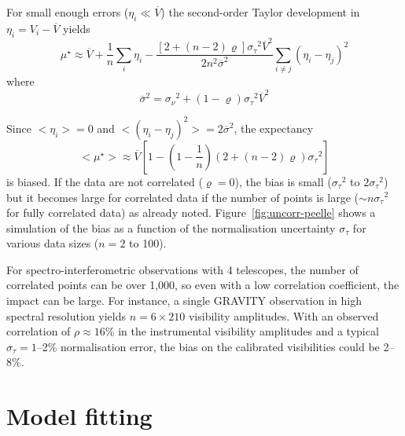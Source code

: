 \documentclass[a4paper,fleqn,usenatbib]{mnras}
\def\expect#1{\ensuremath{ {<#1>} }}
\def\ppp#1{#1^\star}
\def\norm{_\tau}
\def\meas{_\nu}
\def\mean#1{\overline{#1}}
\def\data{\ensuremath{{\scriptstyle V}}}
\def\datamean{\ensuremath{\mean\data}}
\def\mod{\ensuremath{\mu}}
\def\error{\ensuremath{\eta}}
\def\dev{\ensuremath{\sigma}}
\def\devmean{\ensuremath{\mean\dev}}
\def\reldev{\ensuremath{\dev\norm}}
\def\absdev{\ensuremath{\dev\meas}}
\def\corr{\ensuremath{\varrho}}
\begin{document}
For small enough errors ($\error_i \ll \datamean$) the second-order Taylor development in $\error_i = \data_i - \datamean$ yields 
\begin{equation}
    \ppp{\mod} \approx  \datamean 
                  +\frac1n {\sum\limits_i \error_i}
                       - \frac {[2 + (n - 2)\corr]\reldev^2\datamean^2
                          }{
                           2n^2 \devmean^2             
                          }
                           \sum\limits_{i\ne j} (\error_i-\error_j)^2
\end{equation}
where
\begin{equation}
    \devmean^2 = \absdev^2+(1-\corr)\reldev^2\datamean^2 
\end{equation}

Since $\expect{\error_i} = 0$ and $\expect{(\error_i-\error_j)^2} = 2\devmean^2$, the expectancy
\begin{equation}
    \expect{\ppp{\mod}} \approx \datamean 
            \left[ 1 -  
             \left(1-\frac1n\right)
             \left(2 + (n-2)\corr\right)
              \reldev^2 \right]
\end{equation}
is biased.  If the data are not correlated ($\corr = 0$), the bias is small
($\reldev^2$ to $2\reldev^2$) but it becomes large for correlated data if the number of points is large ($\sim n\reldev^2$ for fully correlated data) as \citet{DAG94} already noted. Figure~\ref{fig:uncorr-peelle} shows a simulation of the bias as a function of the normalisation uncertainty $\reldev$ for various data sizes ($n = 2$ to 100). 

For spectro-interferometric observations with 4 telescopes, the number of correlated points can be over 1,000, so even with a low correlation coefficient, the impact can be large. For instance, a single GRAVITY observation in high spectral resolution yields $n = 6 \times 210$ visibility amplitudes. With an observed correlation of $\rho \approx 16$\% in the instrumental visibility amplitudes \citep{KAM20} and a typical $\reldev = 1$--2\% normalisation error, the bias on the calibrated visibilities could be 2--8\%.  

\section{Model fitting}
\label{sec:model}
\end{document}

